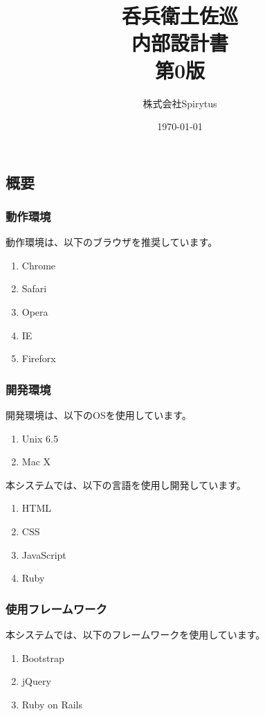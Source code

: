 \documentclass[a4j,titlepage]{jarticle}
\title{呑兵衛土佐巡\\
内部設計書\\
第0版}
\author{株式会社Spirytus}
\date{\today}
\begin{document}
\maketitle
\tableofcontents

\clearpage

\subsection{概要}
\subsubsection{動作環境}
動作環境は、以下のブラウザを推奨しています。
\begin{enumerate}
\item Chrome
\item Safari
\item Opera
\item IE
\item Fireforx
\end{enumerate}

\subsubsection{開発環境}
開発環境は、以下のOSを使用しています。
\begin{enumerate}
\item Unix 6.5
\item Mac X
\end{enumerate}

本システムでは、以下の言語を使用し開発しています。
\begin{enumerate}
\item HTML
\item CSS
\item JavaScript
\item Ruby
\end{enumerate}

\subsubsection{使用フレームワーク}
本システムでは、以下のフレームワークを使用しています。
\begin{enumerate}
\item Bootstrap
\item jQuery
\item Ruby on Rails
\end{enumerate}
\end{document}
